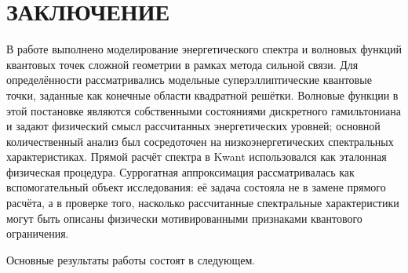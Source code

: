\chapter{ЗАКЛЮЧЕНИЕ}

В работе выполнено моделирование энергетического спектра и волновых функций квантовых
точек сложной геометрии в рамках метода сильной связи. Для определённости рассматривались
модельные суперэллиптические квантовые точки, заданные как конечные области квадратной
решётки. Волновые функции в этой постановке являются собственными состояниями дискретного
гамильтониана и задают физический смысл рассчитанных энергетических уровней; основной
количественный анализ был сосредоточен на низкоэнергетических спектральных
характеристиках. Прямой расчёт спектра в Kwant использовался как эталонная физическая
процедура. Суррогатная аппроксимация рассматривалась как вспомогательный объект
исследования: её задача состояла не в замене прямого расчёта, а в проверке того, насколько
рассчитанные спектральные характеристики могут быть описаны физически мотивированными
признаками квантового ограничения.

Основные результаты работы состоят в следующем.

